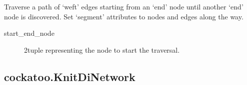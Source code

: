 \documentclass[letterpaper,10pt,english]{sphinxmanual}
\begin{document}
\begin{fulllineitems}
\begin{fulllineitems}
\begin{quote}
\begin{description}
\end{description}\end{quote}

\end{fulllineitems}


\begin{fulllineitems}
\label{\detokenize{cockatoo:cockatoo.KnitNetwork.traverse_weft_edges_and_set_attributes}}
Traverse a path of ‘weft’ edges starting from an ‘end’ node until
another ‘end’ node is discovered. Set ‘segment’ attributes to nodes
and edges along the way.
\begin{description}
\item[{start\_end\_node}] \leavevmode{[}\sphinxhref{https://docs.python.org/2/library/functions.html\#tuple}{\sphinxcode{\sphinxupquote{tuple}}}{]}
2\sphinxhyphen{}tuple representing the node to start the traversal.

\end{description}

\end{fulllineitems}


\end{fulllineitems}



\subsection{cockatoo.KnitDiNetwork}
\label{\detokenize{cockatoo:cockatoo-knitdinetwork}}
\end{document}
